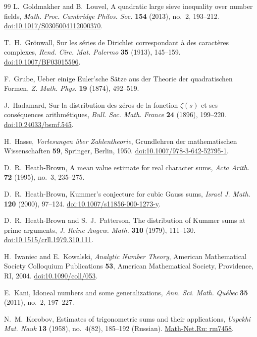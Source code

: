 \documentclass[11pt,a4paper]{article}
\numberwithin{equation}{section}
\numberwithin{figure}{section}
\theoremstyle{definition}
\theoremstyle{remark}
\begin{document}
\begin{thebibliography}{99}
L.~Goldmakher and B.~Louvel,
A quadratic large sieve inequality over number fields,
\emph{Math. Proc. Cambridge Philos. Soc.} \textbf{154} (2013),
no.~2, 193--212.
\href{https://doi.org/10.1017/S0305004112000370}
{doi:10.1017/S0305004112000370}.

T.~H.~Gr\"onwall,
Sur les s\'eries de Dirichlet correspondant \`a des caract\`eres complexes,
\emph{Rend. Circ. Mat. Palermo} \textbf{35} (1913), 145--159.
\href{https://doi.org/10.1007/BF03015596}{doi:10.1007/BF03015596}.

F.~Grube,
Ueber einige Euler'sche S\"atze aus der Theorie der quadratischen Formen,
\emph{Z. Math. Phys.} \textbf{19} (1874), 492--519.

J.~Hadamard,
Sur la distribution des z\'eros de la fonction $\zeta(s)$ et ses
cons\'equences arithm\'etiques,
\emph{Bull. Soc. Math. France} \textbf{24} (1896), 199--220.
\href{https://doi.org/10.24033/bsmf.545}{doi:10.24033/bsmf.545}.

{\raggedright
H.~Hasse,
\emph{Vorlesungen \"uber Zahlentheorie},
Grundlehren der mathematischen Wissenschaften \textbf{59},
Springer, Berlin, 1950.
\href{https://doi.org/10.1007/978-3-642-52795-1}
{doi:10.1007/978-3-642-52795-1}.
\par}

D.~R.~Heath-Brown,
A mean value estimate for real character sums,
\emph{Acta Arith.} \textbf{72} (1995), no.~3, 235--275.

D.~R.~Heath-Brown,
Kummer's conjecture for cubic Gauss sums,
\emph{Israel J. Math.} \textbf{120} (2000), 97--124.
\href{https://doi.org/10.1007/s11856-000-1273-y}
{doi:10.1007/s11856-000-1273-y}.

D.~R.~Heath-Brown and S.~J.~Patterson,
The distribution of Kummer sums at prime arguments,
\emph{J. Reine Angew. Math.} \textbf{310} (1979), 111--130.
\href{https://doi.org/10.1515/crll.1979.310.111}
{doi:10.1515/crll.1979.310.111}.

H.~Iwaniec and E.~Kowalski,
\emph{Analytic Number Theory},
American Mathematical Society Colloquium Publications \textbf{53},
American Mathematical Society, Providence, RI, 2004.
\href{https://doi.org/10.1090/coll/053}{doi:10.1090/coll/053}.

E.~Kani,
Idoneal numbers and some generalizations,
\emph{Ann. Sci. Math. Qu\'ebec} \textbf{35} (2011), no.~2, 197--227.

N.~M.~Korobov,
Estimates of trigonometric sums and their applications,
\emph{Uspekhi Mat. Nauk} \textbf{13} (1958), no.~4(82),
185--192 (Russian).
\href{https://www.mathnet.ru/eng/rm7458}{Math-Net.Ru: rm7458}.


\end{thebibliography}
\end{document}
